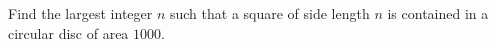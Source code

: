 Find the largest integer $n$ such that a square of side length $n$ is contained in a circular disc of area $1000$.
